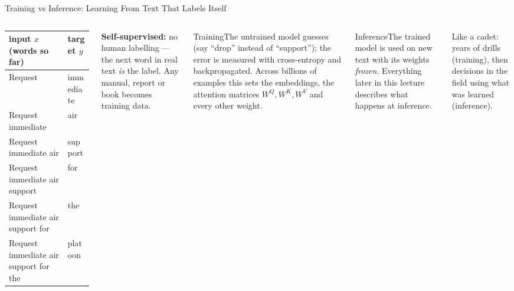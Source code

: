 \documentclass[aspectratio=169,10pt]{beamer}
\begin{document}
\begin{frame}{Training vs Inference: Learning From Text That Labels Itself}
\begin{columns}[T]
\centering\scriptsize\renewcommand{\arraystretch}{1.15}
\begin{tabular}{ll}
\toprule\textbf{input $x$ (words so far)}&\textbf{target $y$}\\\midrule
Request&immediate\\
Request immediate&air\\
Request immediate air&support\\
Request immediate air support&for\\
Request immediate air support for&the\\
Request immediate air support for the&platoon\\\bottomrule
\end{tabular}
\raggedright\vspace{3pt}
\begin{ibox}\scriptsize\textbf{Self-supervised:} no human labelling --- the next word in real text \emph{is} the label. Any manual, report or book becomes training data.\end{ibox}
\begin{cbox}{Training}\scriptsize The untrained model guesses (say ``drop'' instead of ``support''); the error is measured with cross-entropy and backpropagated. Across billions of examples this sets the embeddings, the attention matrices $W^Q,W^K,W^V$ and every other weight.\end{cbox}
\begin{cbox}[ISSAnavy]{Inference}\scriptsize The trained model is used on new text with its weights \emph{frozen}. Everything later in this lecture describes what happens at inference.\end{cbox}
\begin{rbox}\scriptsize Like a cadet: years of drills (training), then decisions in the field using what was learned (inference).\end{rbox}
\end{columns}
\end{frame}
\end{document}
